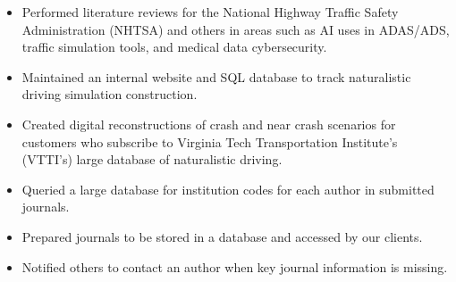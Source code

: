 \documentclass[10pt,a4paper,ragged2e]{altacv}
\begin{document}


\begin{fullwidth}
\makecvheader
\end{fullwidth}



%
%

\begin{itemize}
\item Performed literature reviews for the National Highway Traffic Safety Administration (NHTSA) and others in areas such as AI uses in ADAS/ADS, traffic simulation tools, and medical data cybersecurity. 
\smallskip
\item Maintained an internal website and SQL database to track naturalistic driving simulation construction. 
\smallskip
\item Created digital reconstructions of crash and near crash scenarios for customers who subscribe to Virginia Tech Transportation Institute's (VTTI's) large database of naturalistic driving.
\end{itemize}

\divider

\begin{itemize}
\item Queried a large database for institution codes for each author in submitted journals.
\smallskip
\item Prepared journals to be stored in a database and 
accessed by our clients. 
\smallskip
\item Notified others to contact an author when key journal information is missing.
\end{itemize}
\end{document}
